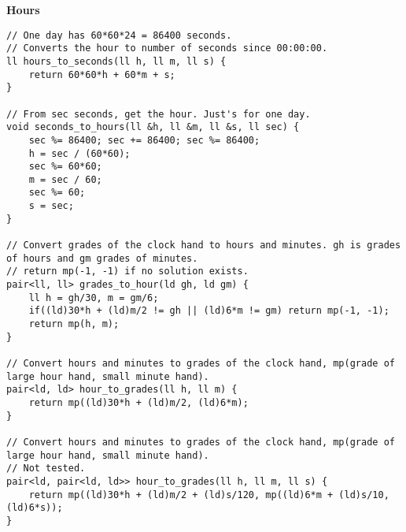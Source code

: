 \documentclass[a4paper,10pt]{article}
\newcommand{\titleAlg}[1]{\vspace{-10pt}
\begin{center}\textbf{#1}\end{center} \vspace{-10pt}}
\begin{document}
\newpage
\titleAlg{Hours}
\begin{multicols}{2}
\begin{verbatim}
// One day has 60*60*24 = 86400 seconds.
// Converts the hour to number of seconds since 00:00:00.
ll hours_to_seconds(ll h, ll m, ll s) {
    return 60*60*h + 60*m + s;
}

// From sec seconds, get the hour. Just's for one day.
void seconds_to_hours(ll &h, ll &m, ll &s, ll sec) {
    sec %= 86400; sec += 86400; sec %= 86400;
    h = sec / (60*60);
    sec %= 60*60;
    m = sec / 60;
    sec %= 60;
    s = sec;
}

// Convert grades of the clock hand to hours and minutes. gh is grades of hours and gm grades of minutes.
// return mp(-1, -1) if no solution exists.
pair<ll, ll> grades_to_hour(ld gh, ld gm) {
    ll h = gh/30, m = gm/6;
    if((ld)30*h + (ld)m/2 != gh || (ld)6*m != gm) return mp(-1, -1);
    return mp(h, m);
}

// Convert hours and minutes to grades of the clock hand, mp(grade of large hour hand, small minute hand).
pair<ld, ld> hour_to_grades(ll h, ll m) {
    return mp((ld)30*h + (ld)m/2, (ld)6*m);
}

// Convert hours and minutes to grades of the clock hand, mp(grade of large hour hand, small minute hand).
// Not tested.
pair<ld, pair<ld, ld>> hour_to_grades(ll h, ll m, ll s) {
    return mp((ld)30*h + (ld)m/2 + (ld)s/120, mp((ld)6*m + (ld)s/10, (ld)6*s));
}
\end{verbatim}
\end{multicols}
\end{document}
